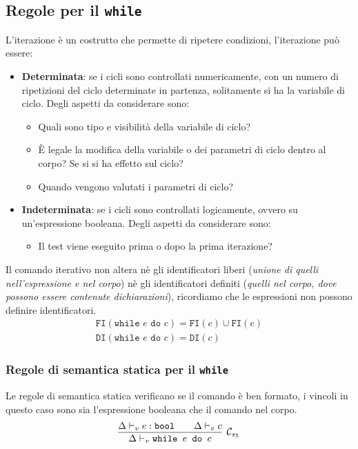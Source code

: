 \documentclass[oneside,a4paper,11pt]{book}
\theoremstyle{italicstyle}
\theoremstyle{normStyle}
\begin{document}
\subsection{Regole per il \texttt{while}}
L'iterazione è un costrutto che permette di ripetere condizioni, l'iterazione 
può essere:
\begin{itemize}
  \item \textbf{Determinata}: se i cicli sono controllati numericamente, con 
  un numero di ripetizioni del ciclo determinate in partenza,
  solitamente si ha la variabile di ciclo. Degli aspetti da considerare sono:
  \begin{itemize}
    \item Quali sono tipo e visibilità della variabile di ciclo?
    \item È legale la modifica della variabile o dei parametri di ciclo dentro al corpo? Se si 
    si ha effetto sul ciclo?
    \item Quando vengono valutati i parametri di ciclo?
  \end{itemize}
  \item \textbf{Indeterminata}: se i cicli sono controllati logicamente, ovvero su un'espressione 
  booleana.
  Degli aspetti da considerare sono:
  \begin{itemize}
    \item Il test viene eseguito prima o dopo la prima iterazione?
  \end{itemize}
\end{itemize}
Il comando iterativo non altera nè gli identificatori liberi (\textit{unione di 
quelli nell'espressione e nel corpo}) nè gli identificatori definiti (\textit{quelli nel corpo, dove possono essere 
contenute dichiarazioni}), ricordiamo che le espressioni non possono definire identificatori.
\begin{align*}
  \texttt{FI}(\texttt{while }e \texttt{ do } c) = \texttt{FI}(c) \cup \texttt{FI}(e)\\
  \texttt{DI}(\texttt{while }e \texttt{ do } c) = \texttt{DI}(c)
\end{align*}
\subsubsection{Regole di semantica statica per il \texttt{while}}
Le regole di semantica statica verificano se il comando è ben formato,
i vincoli in questo caso sono sia l'espressione booleana che il comando nel corpo.
\[
  \infer[\mathcal{C}_{s_5}]  
  {
    \Delta \vdash_v \texttt{while }e\texttt{ do }c
  }
  {
    \Delta \vdash_v e:\texttt{bool}\qquad\Delta\vdash_v c
  }
\]
\end{document}
